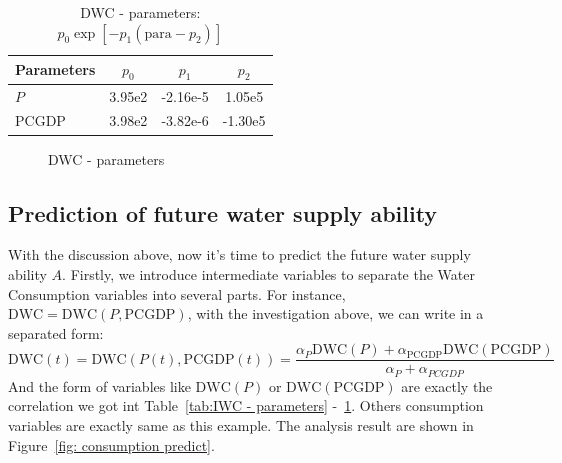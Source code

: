   \begin{table}[!h]
  \centering
  \begin{tabular}{l||c|c|c}
  \hline
  Parameters & $p_0$  &  $p_1$  & $p_2$ \\ \hline
  $P$       &  3.95e2 & -2.16e-5 & 1.05e5 \\ \hline
  $\text{PCGDP}$ & 3.98e2 &  -3.82e-6 & -1.30e5 \\ \hline
  \end{tabular}
  \caption{DWC - parameters: $p_0\exp{[-p_1 (\text{para}-p_2)]}$}
  \label{tab:DWC - parameters}
  \end{table}

  \begin{figure}[!h]
  \centering
  \caption{DWC - parameters}
  \label{fig: DWC para}
  \end{figure}

  \subsection{Prediction of future water supply ability}
  With the discussion above, now it's time to predict the future water supply ability $A$. Firstly, we introduce intermediate variables to separate the Water Consumption variables into several parts. For instance, $\text{DWC} = \text{DWC}(P,\text{PCGDP})$, with the investigation above, we can write in a separated form:
  $$
  \text{DWC}(t) =\text{DWC}(P(t),\text{PCGDP}(t)) = \frac{\alpha_{P}\text{DWC}(P)+\alpha_{\text{PCGDP}}\text{DWC}(\text{PCGDP})}{\alpha_{P}+\alpha_{PCGDP}}
  $$
  And the form of variables like $\text{DWC}(P)$ or $\text{DWC}(\text{PCGDP})$ are exactly the correlation we got int Table~\ref{tab:IWC - parameters} -~\ref{tab:DWC - parameters}.
  Others consumption variables are exactly same as this example. The analysis result are shown in Figure~\ref{fig: consumption predict}.

